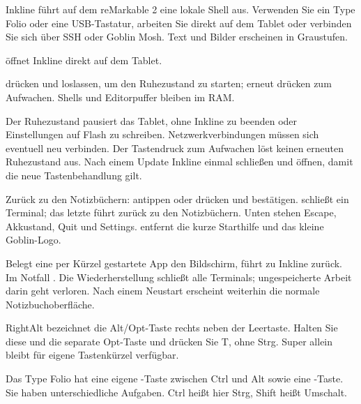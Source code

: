 Inkline führt auf dem reMarkable 2 eine lokale Shell aus. Verwenden Sie ein
Type Folio oder eine USB-Tastatur, arbeiten Sie direkt auf dem Tablet oder
verbinden Sie sich über SSH oder Goblin Mosh. Text und Bilder erscheinen in Graustufen.

\begin{notice}
 öffnet Inkline direkt auf dem Tablet.\par
{} drücken und loslassen, um den Ruhezustand zu starten;
erneut drücken zum Aufwachen. Shells und Editorpuffer bleiben im RAM.
\end{notice}
Der Ruhezustand pausiert das Tablet, ohne Inkline zu beenden oder Einstellungen
auf Flash zu schreiben. Netzwerkverbindungen müssen sich eventuell neu verbinden.
Der Tastendruck zum Aufwachen löst keinen erneuten Ruhezustand aus. Nach einem
Update Inkline einmal schließen und öffnen, damit die neue Tastenbehandlung gilt.

Zurück zu den Notizbüchern:  antippen oder 
drücken und bestätigen.  schließt ein Terminal; das letzte führt
zurück zu den Notizbüchern. Unten stehen Escape, Akkustand, Quit und Settings.
 entfernt die kurze Starthilfe und das kleine Goblin-Logo.

Belegt eine per Kürzel gestartete App den Bildschirm, führt 
zu Inkline zurück. Im Notfall .
Die Wiederherstellung schließt alle Terminals; ungespeicherte Arbeit darin geht
verloren. Nach einem Neustart erscheint weiterhin die normale Notizbuchoberfläche.

RightAlt bezeichnet die Alt/Opt-Taste rechts neben der Leertaste. Halten Sie diese und die separate Opt-Taste und drücken Sie T, ohne Strg. Super allein bleibt für eigene Tastenkürzel verfügbar.

\ProjectLinks

Das Type Folio hat eine eigene -Taste zwischen Ctrl und Alt sowie
eine -Taste. Sie haben unterschiedliche Aufgaben.
Ctrl heißt hier Strg, Shift heißt Umschalt.

